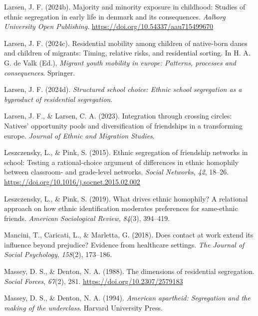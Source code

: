 \documentclass[
]{book}
\newlength{\cslhangindent}
\newenvironment{CSLReferences}[2] %
 {\begin{list}{}{%
  \setlength{\itemindent}{0pt}
  \setlength{\leftmargin}{0pt}
  \setlength{\parsep}{0pt}
  \ifodd #1
   \setlength{\leftmargin}{\cslhangindent}
   \setlength{\itemindent}{-1\cslhangindent}
  \fi
  \setlength{\itemsep}{#2\baselineskip}}}
 {\end{list}}
\begin{document}
\begin{CSLReferences}{1}{0}
Larsen, J. F. (2024b). Majority and minority exposure in childhood: Studies of ethnic segregation in early life in denmark and its consequences. \emph{Aalborg University Open Publishing}. \url{https://doi.org/10.54337/aau715499670}

Larsen, J. F. (2024c). Residential mobility among children of native-born danes and children of migrants: Timing, relative risks, and residential sorting. In H. A. G. de Valk (Ed.), \emph{Migrant youth mobility in europe: Patterns, processes and consequences}. Springer.

Larsen, J. F. (2024d). \emph{Structured school choice: Ethnic school segregation as a byproduct of residential segregation}.

Larsen, J. F., \& Larsen, C. A. (2023). Integration through crossing circles: Natives' opportunity pools and diversification of friendships in a transforming europe. \emph{Journal of Ethnic and Migration Studies}.

Leszczensky, L., \& Pink, S. (2015). Ethnic segregation of friendship networks in school: Testing a rational-choice argument of differences in ethnic homophily between classroom- and grade-level networks. \emph{Social Networks}, \emph{42}, 18--26. \url{https://doi.org/10.1016/j.socnet.2015.02.002}

Leszczensky, L., \& Pink, S. (2019). What drives ethnic homophily? A relational approach on how ethnic identification moderates preferences for same-ethnic friends. \emph{American Sociological Review}, \emph{84}(3), 394--419.

Mancini, T., Caricati, L., \& Marletta, G. (2018). Does contact at work extend its influence beyond prejudice? Evidence from healthcare settings. \emph{The Journal of Social Psychology}, \emph{158}(2), 173--186.

Massey, D. S., \& Denton, N. A. (1988). The dimensions of residential segregation. \emph{Social Forces}, \emph{67}(2), 281. \url{https://doi.org/10.2307/2579183}

Massey, D. S., \& Denton, N. A. (1994). \emph{American apartheid: Segregation and the making of the underclass}. Harvard University Press.


\end{CSLReferences}
\end{document}
